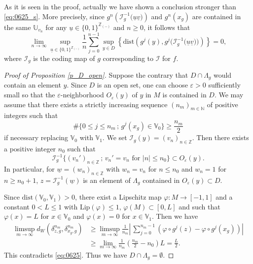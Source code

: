 \documentclass{amsart}
\theoremstyle{definition}
\numberwithin{equation}{section}
\numberwithin{figure}{section}
\begin{document}
As it is seen in the proof, actually we have shown a conclusion stronger than \eqref{eq:0625_s}. 
More precisely, 
since  
$g^n({\mathcal I_g^{-1}\bigl(\underline u\underline v)})$ and $g^n(x_g)$ are contained in the same ${\mathbb{U}}_{v_n}$ 
for any $\underline u \in \{0,1\}^{ \mathbb{Z}_{(-)}}$ and $n\geq 0$, it follows that 
\[
\lim _{n\rightarrow \infty} \sup _{\underline u \in \{0,1\}^{ \mathbb{Z}_{(-)}} }  
\frac1{n} \sum_{j=0}^{n-1}\sup_{ y\in D}\left\{\mathrm{dist}\left(g^j(y),g^j({\mathcal I_g^{-1}\bigl(\underline u\underline v)}\bigr)\right)\right\}=0,
\]
where $\mathcal I_g$ is the coding map of $g$ corresponding to $\mathcal I$ for $f$.


\bigskip

\begin{proof}[Proof of Proposition \ref{p_D_open}]
Suppose the contrary that $D\cap \Lambda_g$ would contain an element $y$.
Since $D$ is an open set, one can choose $\varepsilon>0$ sufficiently small so that the $\varepsilon$-neighborhood $O_\varepsilon(y)$ of $y$ in $M$ is contained in $D$.
We may assume that there exists a strictly increasing sequence $(n_m)_{m\in\mathbb{N}}$ of positive integers 
such that 
$$\#\{0\leq j\leq n_m\,;\,g^j(x_g)\in {\mathbb{V}}_0\}\geq \frac{n_m}2$$ 
if necessary replacing ${\mathbb{V}}_0$ with ${\mathbb{V}}_1$.
We set $\mathcal{I}_g(y)=(v_n)_{n\in \mathbb{Z}}$.
Then there exists a positive integer $n_0$ such that 
$$\mathcal{I}_g^{-1}
\bigl\{(v_n')_{n\in\mathbb{Z}}\,;\, v_n'=v_n \text{ for $|n|\leq n_0$}
\bigr\}\subset O_\varepsilon(y).$$
In particular, for $\underline w=(w_n)_{n\in \mathbb{Z}}$ with $w_n=v_n$ for $n\leq n_0$ and $w_n=1$ for $n\geq n_0+1$, 
$z=\mathcal{I}_g^{-1}(\underline w)$ is an element of $\Lambda_g$ contained in $O_\varepsilon(y)\subset D$.

Since $\mathrm{dist}(\mathbb{V}_0,\mathbb{V}_1)>0$, there exist a Lipschitz 
map $\varphi:M\longrightarrow [-1,1]$ and a constant $0<L\leq 1$ with 
$\mathrm{Lip}(\varphi)\leq 1$, $\varphi(M)\subset [0,L]$ and such that
$\varphi(x)=L$ for $x\in \mathbb{V}_0$ and $\varphi(x)=0$ for $x\in \mathbb{V}_1$. 
Then we have 
\begin{align*}
\limsup_{m\rightarrow \infty}d_W(\delta_{z,g}^{n_m}, \delta_{x_g,g}^{n_m})&\geq 
\limsup_{m\rightarrow \infty}\frac1{n_m}\left|\,\sum_{j=0}^{n_m-1}(\varphi\circ g^j(z)-\varphi\circ g^j(x_g))\right|\\
&\geq \lim_{m\rightarrow \infty}\frac1{n_m}\left(\frac{n_m}2-n_0\right)L=\frac{L}2.
\end{align*}
This contradicts \eqref{eq:0625}.
Thus we have $D\cap \Lambda_g=\emptyset$.
\end{proof} 
\end{document}
